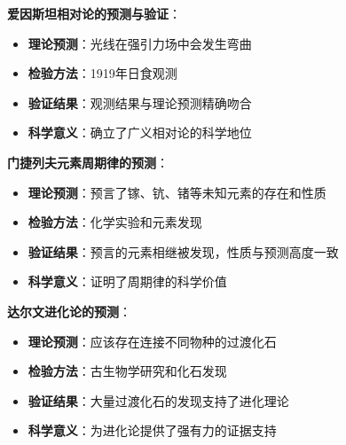 \begin{examplebox}[title=科学说明可证实性的历史实例]
\textbf{爱因斯坦相对论的预测与验证}：
\begin{itemize}
\item \textbf{理论预测}：光线在强引力场中会发生弯曲
\item \textbf{检验方法}：1919年日食观测
\item \textbf{验证结果}：观测结果与理论预测精确吻合
\item \textbf{科学意义}：确立了广义相对论的科学地位
\end{itemize}

\textbf{门捷列夫元素周期律的预测}：
\begin{itemize}
\item \textbf{理论预测}：预言了镓、钪、锗等未知元素的存在和性质
\item \textbf{检验方法}：化学实验和元素发现
\item \textbf{验证结果}：预言的元素相继被发现，性质与预测高度一致
\item \textbf{科学意义}：证明了周期律的科学价值
\end{itemize}

\textbf{达尔文进化论的预测}：
\begin{itemize}
\item \textbf{理论预测}：应该存在连接不同物种的过渡化石
\item \textbf{检验方法}：古生物学研究和化石发现
\item \textbf{验证结果}：大量过渡化石的发现支持了进化理论
\item \textbf{科学意义}：为进化论提供了强有力的证据支持
\end{itemize}
\end{examplebox}

